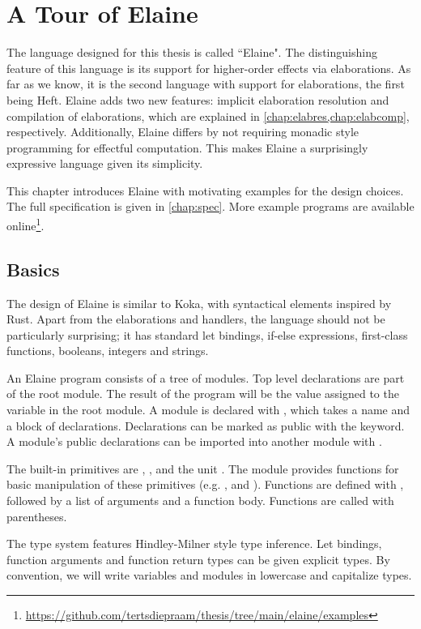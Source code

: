 \chapter{A Tour of Elaine}\label{chap:basics}

The language designed for this thesis is called ``Elaine". The distinguishing feature of this language is its support for higher-order effects via elaborations. As far as we know, it is the second language with support for elaborations, the first being Heft. Elaine adds two new features: implicit elaboration resolution and compilation of elaborations, which are explained in \cref{chap:elabres,chap:elabcomp}, respectively. Additionally, Elaine differs by not requiring monadic style programming for effectful computation. This makes Elaine a surprisingly expressive language given its simplicity.

This chapter introduces Elaine with motivating examples for the design choices. The full specification is given in \cref{chap:spec}. More example programs are available online\footnote{\url{https://github.com/tertsdiepraam/thesis/tree/main/elaine/examples}}.

\section{Basics}

The design of Elaine is similar to Koka, with syntactical elements inspired by Rust. Apart from the elaborations and handlers, the language should not be particularly surprising; it has standard let bindings, if-else expressions, first-class functions, booleans, integers and strings.

An Elaine program consists of a tree of modules. Top level declarations are part of the root module. The result of the program will be the value assigned to the  variable in the root module. A module is declared with , which takes a name and a block of declarations. Declarations can be marked as public with the  keyword. A module's public declarations can be imported into another module with .

The built-in primitives are , ,  and the unit \el{()}. The  module provides functions for basic manipulation of these primitives (e.g. ,  and ). Functions are defined with , followed by a list of arguments and a function body. Functions are called with parentheses.

The type system features Hindley-Milner style type inference. Let bindings, function arguments and function return types can be given explicit types. By convention, we will write variables and modules in lowercase and capitalize types.


